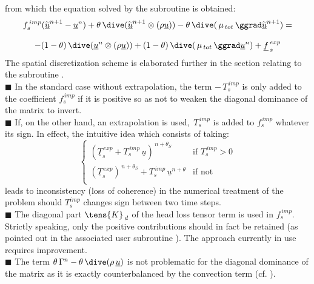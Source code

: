 from which the equation solved by the subroutine  is obtained:
\begin{equation}\begin{array}{c}
\displaystyle
f_s^{\,imp}(\underline {\widetilde{u}}^{n+1}-\underline {u}^{n}) + \theta\, \dive(\underline{\widetilde{u}}^{n+1} \otimes (\rho
\underline{u})) - \theta\,\dive (\,\mu_{\,tot}\,\ggrad \underline{\widetilde{u}}^{n+1}) =
\\\\
\displaystyle
-(1-\theta)\,\dive(\underline{u}^{n} \otimes (\rho \underline{u}))+(1-\theta)\,\dive (\,\mu_{\,tot}\,\ggrad \underline{u}^{n})
+ \underline{f}_{\,s}^{\,exp}
\end{array}
\end{equation}
The spatial discretization scheme is elaborated further in the section relating to the subroutine .\\



{\tiny$\blacksquare$} In the standard case without extrapolation, the term
$-\,T_s^{\,imp}$ is only added to the coefficient $f_s^{\,imp}$ if it is positive so as not to weaken
the diagonal dominance of the matrix to invert.\\
{\tiny$\blacksquare$} If, on the other hand, an extrapolation is used,
$\,T_s^{\,imp}$ is added to $f_s^{\,imp}$ whatever its sign. In effect, the intuitive idea which consists of taking:
\begin{equation}
\begin{cases}
\displaystyle
(\underline{T}_{s}^{\,exp} + T_{s}^{\,imp}\,\underline {u})^{\,n+\theta_S} &
\text{if } T_{s}^{\,imp} > 0\\
\displaystyle
(\underline{T}_{s}^{\,exp})^{\,n+\theta_S} + T_{s}^{\,imp}\,\underline{u}^{n+\theta} &\text{if not}\\
\end{cases}
\end{equation}
leads to inconsistency (loss of coherence) in the numerical treatment of the problem should $T_s^{imp}$ changes sign between two time steps.\\
{\tiny$\blacksquare$} The diagonal part $\tens{K}_{\,d}$ of the head loss tensor term is used in $f_s^{\,imp}$. Strictly speaking, only the positive contributions should in fact be retained (as pointed out in the associated user subroutine ). The  approach currently in use requires improvement.\\
{\tiny$\blacksquare$} The term $\theta\,\Gamma^{n}-\theta\,\dive
(\rho\,\underline {u})$ is not problematic for the diagonal dominance of the matrix as it is exactly counterbalanced by the convection term (cf. ).

